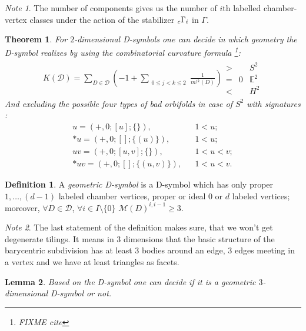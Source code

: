 \documentclass[12pt,a4paper]{article}
\numberwithin{equation}{section}
\newcommand{\leftsub}[2]{{\vphantom{#2}}_{#1}{#2}}
\theoremstyle{plain}%
\newtheorem{thm}{Theorem}[section]
\newtheorem{lem}[thm]{Lemma}
\theoremstyle{definition}
\newtheorem{defn}{Definition}[section]
\theoremstyle{remark}
\newtheorem*{note}{Note}
\begin{document}
\begin{note}
  The number of components gives us the number of $i$th labelled chamber-vertex
  classes under the action of the stabilizer $\leftsub{c}{\Gamma}_i$ in $\Gamma$.
\end{note}

\begin{thm}
  \label{thm:curvature}
  For $2$-dimensional D-symbols one can decide in which geometry the
  D-symbol realizes by using the {\em combinatorial curvature formula}
  \footnote{FIXME cite}:
  \begin{align*}
    K(\mathcal{D})=\sum_{D\in
    \mathcal{D}}\left(-1+\sum_{\substack{0\le j<k\le 2}}\frac{1}{m^{jk}(D)}\right)
    \begin{array}{cccc}
      > & & S^2 \\
      = & 0 & \mathbb{E}^2 \\
      < & & H^2
    \end{array}
  \end{align*}
  And excluding the possible four types of bad orbifolds in case of $S^2$ with 
  signatures \cite{Ma67}:
  \begin{align*}
    u=(+,0;[u];\{\}), & & 1<u;\\
    *u=(+,0;[];\{(u)\}), & & 1<u;\\
    uv=(+,0;[u,v];\{\}), & & 1<u<v;\\
    *uv=(+,0;[];\{(u,v)\}), & & 1<u<v.
  \end{align*}
\end{thm}

\begin{defn}
  A {\em geometric D-symbol} is a D-symbol which
  has only proper $1,\ldots,(d-1)$ labeled chamber vertices, proper or ideal $0$ or
  $d$ labeled vertices; moreover, $\forall D\in \mathcal{D}$, $\forall i\in
  I\setminus\{0\}$ $\mathcal{M}(D)^{i,i-1}\geq3$.
\end{defn}

\begin{note}
  The last statement of the definition makes sure, that we won't get degenerate
  tilings. It means in $3$ dimensions that the basic structure of the barycentric
  subdivision has at least 3 bodies around an edge, 3 edges meeting in a
  vertex and we have at least triangles as facets.
\end{note}

\begin{lem}
  Based on the D-symbol one can decide if it is a geometric $3$-dimensional
  D-symbol or not.
\end{lem}
\end{document}
